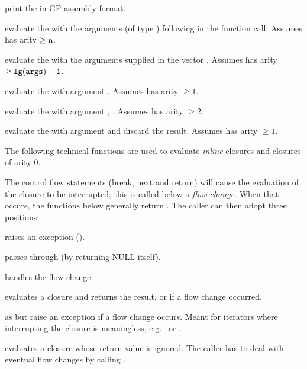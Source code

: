 
 print the   in
GP assembly format.

 evaluate the 
 with the  arguments (of type ) following  in
the function call. Assumes  has arity $\geq {\tt n}$.

 evaluate the 
 with the arguments supplied in the vector . Assumes 
has arity $\geq {\tt lg(args)-1}$.

 evaluate the 
 with argument . Assumes  has arity $\geq 1$.

 evaluate the 
 with argument , . Assumes  has arity $\geq 2$.

 evaluate the 
 with argument  and discard the result. Assumes 
has arity $\geq 1$.

The following technical functions are used to evaluate \emph{inline}
closures and closures of arity 0.

The control flow statements (break, next and return) will cause the
evaluation of the closure to be interrupted; this is called below a
\emph{flow change}. When that occurs, the functions below generally
 return . The caller can then adopt three positions:

\item raises an exception ().

\item passes through (by returning NULL itself).

\item handles the flow change.

 evaluates a closure and returns the result,
or  if a flow change occurred.

 as  but raise
an exception if a flow change occurs. Meant for iterators where
interrupting the closure is meaningless, e.g.~ or .

 evaluates a closure whose return
value is ignored. The caller has to deal with eventual flow changes by
calling .

